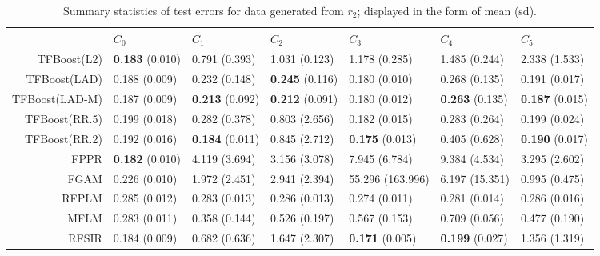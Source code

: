 \begin{table}[H]
\centering
\footnotesize
\begin{tabular}{rllllll}
  \hline
 & $C_0$ & $C_1$ & $C_2$ & $C_3$ & $C_4$ & $C_5$ \\ 
  \hline
TFBoost(L2) & \textbf{0.183} (0.010) & 0.791 (0.393) & 1.031 (0.123) & 1.178 (0.285) & 1.485 (0.244) & 2.338 (1.533) \\ 
  TFBoost(LAD) & 0.188 (0.009) & 0.232 (0.148) & \textbf{0.245} (0.116) & 0.180 (0.010) & 0.268 (0.135) & 0.191 (0.017) \\ 
  TFBoost(LAD-M) & 0.187 (0.009) & \textbf{0.213} (0.092) & \textbf{0.212} (0.091) & 0.180 (0.012) & \textbf{0.263} (0.135) & \textbf{0.187} (0.015) \\ 
  TFBoost(RR.5) & 0.199 (0.018) & 0.282 (0.378) & 0.803 (2.656) & 0.182 (0.015) & 0.283 (0.264) & 0.199 (0.024) \\ 
  TFBoost(RR.2) & 0.192 (0.016) & \textbf{0.184} (0.011) & 0.845 (2.712) & \textbf{0.175} (0.013) & 0.405 (0.628) & \textbf{0.190} (0.017) \\ 
  FPPR & \textbf{0.182} (0.010) & 4.119 (3.694) & 3.156 (3.078) & 7.945 (6.784) & 9.384 (4.534) & 3.295 (2.602) \\ 
  FGAM & 0.226 (0.010) & 1.972 (2.451) & 2.941 (2.394) & 55.296 (163.996) & 6.197 (15.351) & 0.995 (0.475) \\ 
  RFPLM & 0.285 (0.012) & 0.283 (0.013) & 0.286 (0.013) & 0.274 (0.011) & 0.281 (0.014) & 0.286 (0.016) \\ 
  MFLM & 0.283 (0.011) & 0.358 (0.144) & 0.526 (0.197) & 0.567 (0.153) & 0.709 (0.056) & 0.477 (0.190) \\ 
  RFSIR & 0.184 (0.009) & 0.682 (0.636) & 1.647 (2.307) & \textbf{0.171} (0.005) & \textbf{0.199} (0.027) & 1.356 (1.319) \\ 
   \hline
\end{tabular}
\caption{Summary statistics of test errors for data generated from $r_2$; displayed in the form of mean (sd).} 
\end{table}
